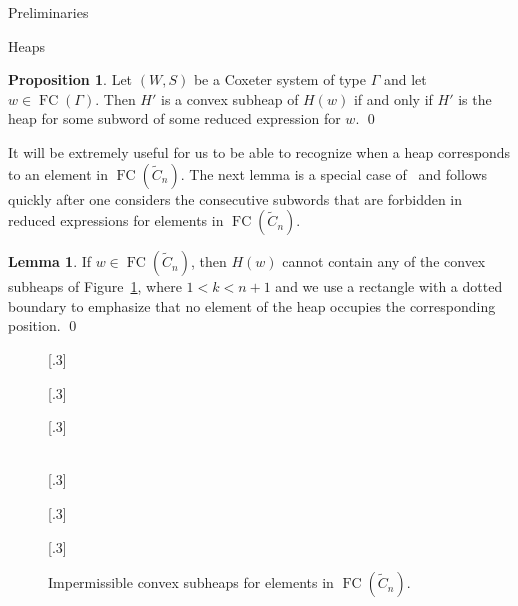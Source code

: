 \documentclass[11pt]{amsart}
\theoremstyle{definition}
\newtheorem{lemma}[theorem]{Lemma}
\newtheorem{proposition}[theorem]{Proposition}
\numberwithin{equation}{section}
\newcommand{\C}{\widetilde{C}}
\renewcommand{\(}{\left(}
\renewcommand{\)}{\right)}
\DeclareMathOperator{\FC}{FC}
\newcommand\xxaxis{0}
\newcommand\yyaxis{90}
\newcommand\heapblock[3]{\fill[draw=black, fill=gray!30, rounded corners, line width=1.1pt, shift={(\xxaxis:#1)},shift={(\yyaxis:#2)}] (-1,-0.5) rectangle (1,0.5);\node at (#1,#2) {\scriptsize $#3$};}
\newcommand\heapblank[2]{\fill[fill=white, dotted, draw=black, line width=1.1pt, rounded corners, shift={(\xxaxis:#1)},shift={(\yyaxis:#2)}] (-1,-0.5) rectangle (1,0.5);}
\begin{document}
\begin{section}{Preliminaries}
\begin{subsection}{Heaps}
\begin{proposition}
Let $(W,S)$ be a Coxeter system of type $\Gamma$ and let $w \in \FC(\Gamma)$. Then $H'$ is a convex subheap of $H(w)$ if and only if $H'$ is the heap for some subword of some reduced expression for $w$.   \qed
\end{proposition}

It will be extremely useful for us to be able to recognize when a heap corresponds to an element in $\FC(\C_{n})$.  The next lemma is a special case of~\cite[Proposition 3.3]{Stembridge1996} and follows quickly after one considers the consecutive subwords that are forbidden in reduced expressions for elements in $\FC(\C_{n})$.

\begin{lemma}\label{lem:impermissible heap configs}
If $w \in \FC(\C_{n})$, then $H(w)$ cannot contain any of the convex subheaps of Figure~\ref{fig:impermissible heap configs}, where $1<k<n+1$ and we use a rectangle with a dotted boundary to emphasize that no element of the heap occupies the corresponding position.  \qed
\end{lemma}

\begin{figure}[!ht]
\subcaptionbox{}[.3\linewidth]{
}
\subcaptionbox{}[.3\linewidth]{
}
\subcaptionbox{}[.3\linewidth]{
}\\
\vspace{1em}
\subcaptionbox{}[.3\linewidth]{
}
\subcaptionbox{}[.3\linewidth]{
}
\subcaptionbox{}[.3\linewidth]{
}
\caption{Impermissible convex subheaps for elements in $\FC(\C_n)$.}\label{fig:impermissible heap configs}
\end{figure}


\end{subsection}
\end{section}
\end{document}
